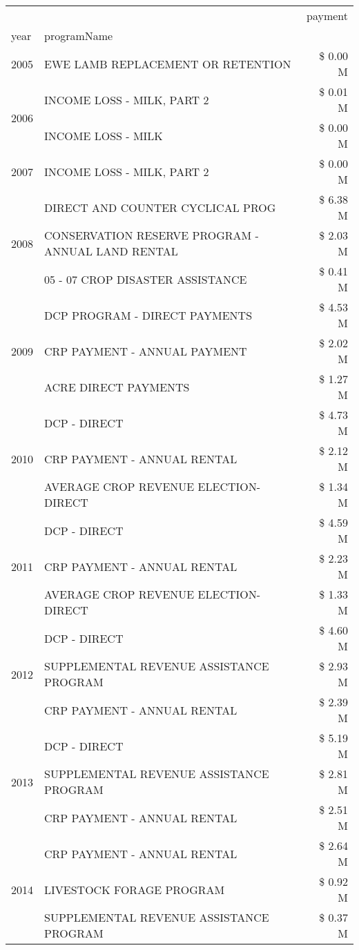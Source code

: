 \begin{tabular}{llr}
\toprule
 &  & payment \\
year & programName &  \\
\midrule
2005 & EWE LAMB REPLACEMENT OR RETENTION & \$ 0.00 M \\
\cline{1-3}
\multirow[t]{2}{*}{2006} & INCOME LOSS - MILK, PART 2 & \$ 0.01 M \\
 & INCOME LOSS - MILK & \$ 0.00 M \\
\cline{1-3}
2007 & INCOME LOSS - MILK, PART 2 & \$ 0.00 M \\
\cline{1-3}
\multirow[t]{3}{*}{2008} & DIRECT AND COUNTER CYCLICAL PROG & \$ 6.38 M \\
 & CONSERVATION RESERVE PROGRAM - ANNUAL LAND RENTAL & \$ 2.03 M \\
 & 05 - 07 CROP DISASTER ASSISTANCE & \$ 0.41 M \\
\cline{1-3}
\multirow[t]{3}{*}{2009} & DCP PROGRAM - DIRECT PAYMENTS & \$ 4.53 M \\
 & CRP PAYMENT - ANNUAL PAYMENT & \$ 2.02 M \\
 & ACRE DIRECT PAYMENTS & \$ 1.27 M \\
\cline{1-3}
\multirow[t]{3}{*}{2010} & DCP - DIRECT & \$ 4.73 M \\
 & CRP PAYMENT - ANNUAL RENTAL & \$ 2.12 M \\
 & AVERAGE CROP REVENUE ELECTION-DIRECT & \$ 1.34 M \\
\cline{1-3}
\multirow[t]{3}{*}{2011} & DCP - DIRECT & \$ 4.59 M \\
 & CRP PAYMENT - ANNUAL RENTAL & \$ 2.23 M \\
 & AVERAGE CROP REVENUE ELECTION-DIRECT & \$ 1.33 M \\
\cline{1-3}
\multirow[t]{3}{*}{2012} & DCP - DIRECT & \$ 4.60 M \\
 & SUPPLEMENTAL REVENUE ASSISTANCE PROGRAM & \$ 2.93 M \\
 & CRP PAYMENT - ANNUAL RENTAL & \$ 2.39 M \\
\cline{1-3}
\multirow[t]{3}{*}{2013} & DCP - DIRECT & \$ 5.19 M \\
 & SUPPLEMENTAL REVENUE ASSISTANCE PROGRAM & \$ 2.81 M \\
 & CRP PAYMENT - ANNUAL RENTAL & \$ 2.51 M \\
\cline{1-3}
\multirow[t]{3}{*}{2014} & CRP PAYMENT - ANNUAL RENTAL & \$ 2.64 M \\
 & LIVESTOCK FORAGE PROGRAM & \$ 0.92 M \\
 & SUPPLEMENTAL REVENUE ASSISTANCE PROGRAM & \$ 0.37 M \\

\end{tabular}
